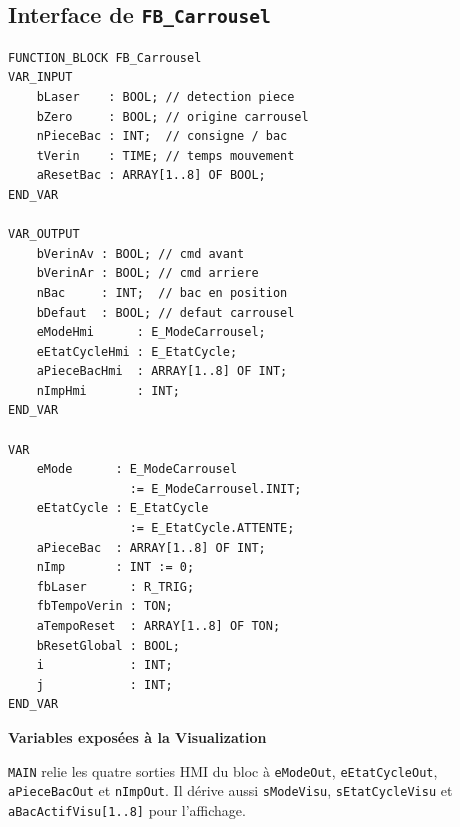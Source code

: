 \begin{minipage}[t]{0.49\textwidth}\vspace{0pt}
  \subsection{Interface de \texttt{FB\_Carrousel}}
\begin{lstlisting}[style=stcode]
FUNCTION_BLOCK FB_Carrousel
VAR_INPUT
    bLaser    : BOOL; // detection piece
    bZero     : BOOL; // origine carrousel
    nPieceBac : INT;  // consigne / bac
    tVerin    : TIME; // temps mouvement
    aResetBac : ARRAY[1..8] OF BOOL;
END_VAR

VAR_OUTPUT
    bVerinAv : BOOL; // cmd avant
    bVerinAr : BOOL; // cmd arriere
    nBac     : INT;  // bac en position
    bDefaut  : BOOL; // defaut carrousel
    eModeHmi      : E_ModeCarrousel;
    eEtatCycleHmi : E_EtatCycle;
    aPieceBacHmi  : ARRAY[1..8] OF INT;
    nImpHmi       : INT;
END_VAR

VAR
    eMode      : E_ModeCarrousel
                 := E_ModeCarrousel.INIT;
    eEtatCycle : E_EtatCycle
                 := E_EtatCycle.ATTENTE;
    aPieceBac  : ARRAY[1..8] OF INT;
    nImp       : INT := 0;
    fbLaser      : R_TRIG;
    fbTempoVerin : TON;
    aTempoReset  : ARRAY[1..8] OF TON;
    bResetGlobal : BOOL;
    i            : INT;
    j            : INT;
END_VAR
\end{lstlisting}

  \begin{primarycard}
    \textbf{Variables exposées à la Visualization}\par\small
    \texttt{MAIN} relie les quatre sorties HMI du bloc à \texttt{eModeOut}, \texttt{eEtatCycleOut}, \texttt{aPieceBacOut} et \texttt{nImpOut}. Il dérive aussi \texttt{sModeVisu}, \texttt{sEtatCycleVisu} et \texttt{aBacActifVisu[1..8]} pour l'affichage.
  \end{primarycard}
\end{minipage}
